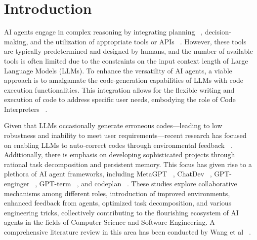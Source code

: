 \section{Introduction}
AI agents engage in complex reasoning by integrating planning ~\cite{wei2022chain, xu2023rewoo, wang2023selfconsistency, yao2023tree}, decision-making, and the utilization of appropriate tools or APIs ~\cite{schick2023toolformer, li2023apibank}. However, these tools are typically predetermined and designed by humans, and the number of available tools is often limited due to the constraints on the input context length of Large Language Models (LLMs). To enhance the versatility of AI agents, a viable approach is to amalgamate the code-generation capabilities of LLMs with code execution functionalities. This integration allows for the flexible writing and execution of code to address specific user needs, embodying the role of Code Interpreters ~\cite{openinterpreter}.

Given that LLMs occasionally generate erroneous codes—leading to low robustness and inability to meet user requirements—recent research has focused on enabling LLMs to auto-correct codes through environmental feedback ~\cite{skreta2023errors, yao2022react, wang2023voyager, song2023llmplanner}. Additionally, there is emphasis on developing sophisticated projects through rational task decomposition and persistent memory. This focus has given rise to a plethora of AI agent frameworks, including MetaGPT ~\cite{hong2023metagpt}, ChatDev ~\cite{qian2023communicative}, GPT-enginger ~\cite{GPTEngineer}, GPT-term ~\cite{GPTeam}, and codeplan ~\cite{bairi2023codeplan}. These studies explore collaborative mechanisms among different roles, introduction of improved environments, enhanced feedback from agents, optimized task decomposition, and various engineering tricks, collectively contributing to the flourishing ecosystem of AI agents in the fields of Computer Science and Software Engineering. A comprehensive literature review in this area has been conducted by Wang et al ~\cite{wang2023survey}.
